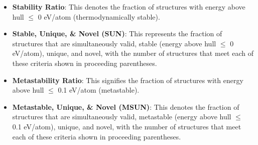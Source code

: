 \documentclass{article}
\theoremstyle{plain}
\theoremstyle{definition}
\theoremstyle{remark}
\begin{document}
\begin{itemize}
    \item \textbf{Stability Ratio}: This denotes the fraction of structures with energy above hull $\leq$ 0 eV/atom (thermodynamically stable).
    \item \textbf{Stable, Unique, \& Novel (SUN)}: This represents the fraction of structures that are simultaneously valid, stable (energy above hull $\leq$ 0 eV/atom), unique, and novel, with the number of structures that meet each of these criteria shown in proceeding parentheses.
    \item \textbf{Metastability Ratio}: This signifies the fraction of structures with energy above hull $\leq$ 0.1 eV/atom (metastable).
    \item \textbf{Metastable, Unique, \& Novel (MSUN)}: This denotes the fraction of structures that are simultaneously valid, metastable (energy above hull $\leq$ 0.1 eV/atom), unique, and novel, with the number of structures that meet each of these criteria shown in proceeding parentheses.
\end{itemize}
\end{document}
